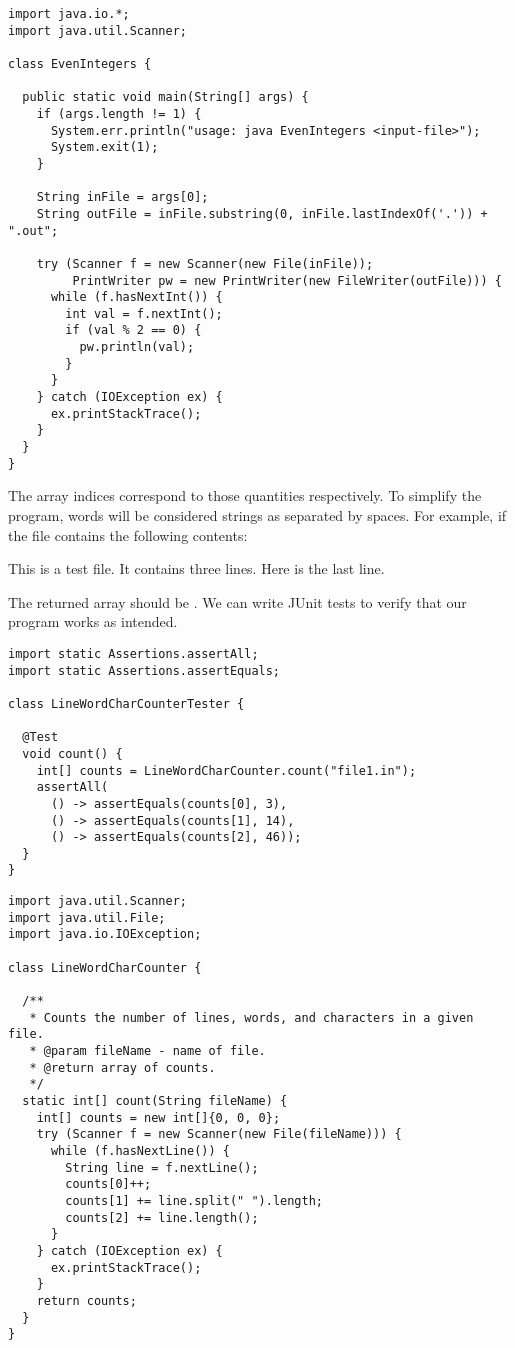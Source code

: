\begin{lstlisting}[language=MyJava]
import java.io.*;
import java.util.Scanner;

class EvenIntegers {

  public static void main(String[] args) {
    if (args.length != 1) {
      System.err.println("usage: java EvenIntegers <input-file>");
      System.exit(1);
    }

    String inFile = args[0];
    String outFile = inFile.substring(0, inFile.lastIndexOf('.')) + ".out";

    try (Scanner f = new Scanner(new File(inFile));
         PrintWriter pw = new PrintWriter(new FileWriter(outFile))) {
      while (f.hasNextInt()) {
        int val = f.nextInt();
        if (val % 2 == 0) { 
          pw.println(val); 
        }
      }
    } catch (IOException ex) { 
      ex.printStackTrace(); 
    }
  }
}
\end{lstlisting}

The array indices correspond to those quantities respectively. 
To simplify the program, words will be considered strings as separated by spaces. 
For example, if the file contains the following contents:

\begin{verbnobox}[\small]
This is a test file.
It contains three lines.
Here is the last line.
\end{verbnobox}

The returned array should be \ttt{[3, 14, 46]}. 
We can write JUnit tests to verify that our program works as intended.

\begin{lstlisting}[language=MyJava]
import static Assertions.assertAll;
import static Assertions.assertEquals;

class LineWordCharCounterTester {

  @Test
  void count() {
    int[] counts = LineWordCharCounter.count("file1.in");
    assertAll(
      () -> assertEquals(counts[0], 3),
      () -> assertEquals(counts[1], 14),
      () -> assertEquals(counts[2], 46));
  }
}
\end{lstlisting}

\begin{lstlisting}[language=MyJava]
import java.util.Scanner;
import java.util.File;
import java.io.IOException;

class LineWordCharCounter {

  /**
   * Counts the number of lines, words, and characters in a given file.
   * @param fileName - name of file.
   * @return array of counts.
   */
  static int[] count(String fileName) {
    int[] counts = new int[]{0, 0, 0};
    try (Scanner f = new Scanner(new File(fileName))) {
      while (f.hasNextLine()) {
        String line = f.nextLine();
        counts[0]++;
        counts[1] += line.split(" ").length;
        counts[2] += line.length();
      }
    } catch (IOException ex) { 
      ex.printStackTrace(); 
    }
    return counts;
  }
}
\end{lstlisting}

